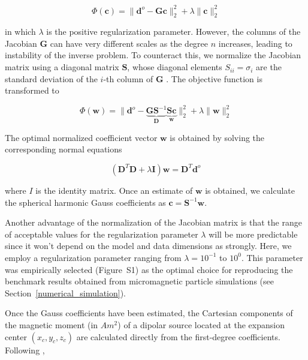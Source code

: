\begin{equation}
\Phi(\mathbf{c}) = \| \mathbf{d}^o - \mathbf{G}\mathbf{c} \|_2^2 + \lambda \| \mathbf{c} \|_2^2
\end{equation}

\noindent
in which $\lambda$ is the positive regularization parameter. However, the columns of the Jacobian $\mathbf{G}$ can have very different scales as the degree $n$ increases, leading to instability of the inverse problem. To counteract this, we normalize the Jacobian matrix using a diagonal matrix $\mathbf{S}$, whose diagonal elements $S_{ii} = \sigma_i$ are the standard deviation of the $i$-th column of $\mathbf{G}$ \citep{Soler2021}. The objective function is transformed to 

\begin{equation}
\Phi(\mathbf{w}) = \| \mathbf{d}^o - \underbrace{\mathbf{G}\mathbf{S}^{-1}}_{\mathbf{D}}\underbrace{\mathbf{S}\mathbf{c}}_{\mathbf{w}} \|_2^2 + \lambda \| \mathbf{w} \|_2^2
\end{equation}

The optimal normalized coefficient vector $\mathbf{w}$ is obtained by solving the corresponding normal equations

\begin{equation}
(\mathbf{D}^T \mathbf{D} + \lambda \mathbf{I})\mathbf{w} = \mathbf{D}^T \mathbf{d}^o
\end{equation}

\noindent
where $I$ is the identity matrix. Once an estimate of $\mathbf{w}$ is obtained, we calculate the spherical harmonic Gauss coefficients as $\mathbf{c} = \mathbf{S}^{-1}\mathbf{w}$.

Another advantage of the normalization of the Jacobian matrix is that the range of acceptable values for the regularization parameter $\lambda$ will be more predictable since it won't depend on the model and data dimensions as strongly. Here, we employ a regularization parameter ranging from $\lambda = 10^{-1}$ to $10^{0}$. This parameter was empirically selected (Figure~S1) as the optimal choice for reproducing the benchmark results obtained from micromagnetic particle simulations (see Section~\ref{numerical_simulation}).

Once the Gauss coefficients have been estimated, the Cartesian components of the magnetic moment (in $Am^2$) of a dipolar source located at the expansion center $(x_c, y_c, z_c)$ are calculated directly from the first-degree coefficients. Following \citet{Blakely1996},


